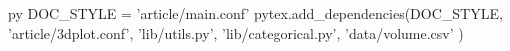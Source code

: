 \usepackage{makecell}
\usepackage{siunitx}

\newcommand\SIci[5]{\SI{#1}{#2}, {#3}CI: \SIrange{#4}{#5}{#2}}

\newcommand{\sessionpy}{%
	  \edef\sessionpysession{session\arabic{pysessioncounter}}%
	    \stepcounter{pysessioncounter}%
	      \expandafter\py\expandafter[\sessionpysession]}


\usepackage[autoprint=false, gobble=auto, pyfuture=all]{pythontex} %
\usepackage{pgf} %


\begin{pythontexcustomcode}[begin]{py}
DOC_STYLE = 'article/main.conf'
pytex.add_dependencies(DOC_STYLE,
	'article/3dplot.conf',
	'lib/utils.py',
	'lib/categorical.py',
	'data/volume.csv'
	)
\end{pythontexcustomcode}